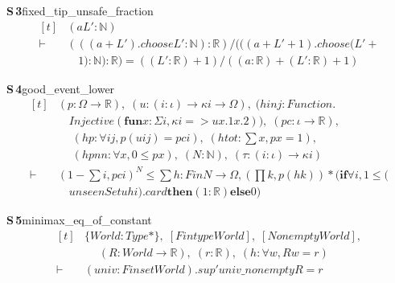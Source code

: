 \documentclass[conference]{IEEEtran}
\theoremstyle{definition}
\newcommand{\lean}[1]{\textsf{\footnotesize #1}}
\begin{document}
\noindent\textbf{S\,3}\quad\lean{fixed\_tip\_unsafe\_fraction}
{\footnotesize\[ \begin{aligned}[t]
&(\mathit{a} \mathit{L'} : \mathbb{N} )\\
\vdash\;&(((\mathit{a} + \mathit{L'}).\mathit{choose} \mathit{L'} : \mathbb{N} ) : \mathbb{R} ) / (((\mathit{a} + \mathit{L'} + 1).\mathit{choose} (\mathit{L'} +\\
&\quad 1) : \mathbb{N} ) : \mathbb{R} ) = ((\mathit{L'} : \mathbb{R} ) + 1) / ((\mathit{a} : \mathbb{R} ) + (\mathit{L'} : \mathbb{R} ) + 1)
\end{aligned} \]}

\noindent\textbf{S\,4}\quad\lean{good\_event\_lower}
{\footnotesize\[ \begin{aligned}[t]
&(\mathit{p} : \Omega \to \mathbb{R} ),\; (\mathit{u} : (\mathit{i} : \iota ) \to \kappa \mathit{i} \to \Omega ),\; (\mathit{hinj} : \mathit{Function}.\\
&\quad \mathit{Injective} (\mathbf{fun} \mathit{x} : \Sigma \mathit{i}, \kappa \mathit{i} => \mathit{u} \mathit{x}.1 \mathit{x}.2)),\; (\mathit{pc} : \iota \to \mathbb{R} ),\\
&\quad \; (\mathit{hp} : \forall \mathit{i} \mathit{j}, \mathit{p} (\mathit{u} \mathit{i} \mathit{j}) = \mathit{pc} \mathit{i}),\; (\mathit{htot} : \textstyle\sum \mathit{x}, \mathit{p} \mathit{x} = 1),\\
&\quad \; (\mathit{hpnn} : \forall \mathit{x}, 0 \leq \mathit{p} \mathit{x}),\; (\mathit{N} : \mathbb{N} ),\; (\tau : (\mathit{i} : \iota ) \to \kappa \mathit{i})\\
\vdash\;&(1 - \textstyle\sum \mathit{i}, \mathit{pc} \mathit{i}) ^{\mathit{N}} \leq \textstyle\sum \mathit{h} : \mathit{Fin} \mathit{N} \to \Omega , (\textstyle\prod \mathit{k}, \mathit{p} (\mathit{h} \mathit{k})) * (\mathbf{if} \forall \mathit{i}, 1 \leq (\\
&\quad \mathit{unseenSet} \mathit{u} \mathit{h} \mathit{i}).\mathit{card} \mathbf{then} (1:\mathbb{R} ) \mathbf{else} 0)
\end{aligned} \]}

\noindent\textbf{S\,5}\quad\lean{minimax\_eq\_of\_constant}
{\footnotesize\[ \begin{aligned}[t]
&\{ \mathit{World} : \mathit{Type}*\},\; [\mathit{Fintype} \mathit{World}],\; [\mathit{Nonempty} \mathit{World}],\\
&\quad \; (\mathit{R} : \mathit{World} \to \mathbb{R} ),\; (\mathit{r} : \mathbb{R} ),\; (\mathit{h} : \forall \mathit{w}, \mathit{R} \mathit{w} = \mathit{r})\\
\vdash\;&(\mathit{univ} : \mathit{Finset} \mathit{World}).\mathit{sup'} \mathit{univ\_nonempty} \mathit{R} = \mathit{r}
\end{aligned} \]}
\end{document}
